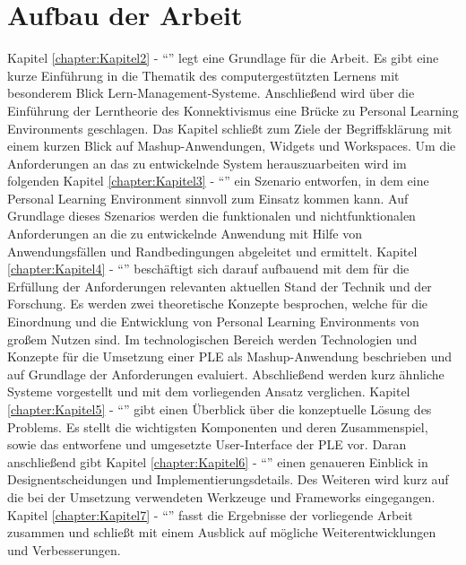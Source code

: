 \section{Aufbau der Arbeit}
Kapitel \ref{chapter:Kapitel2} - "`"' legt eine Grundlage für die Arbeit. Es gibt eine kurze Einführung in die Thematik des computergestützten Lernens mit besonderem Blick Lern-Management-Systeme. Anschließend wird über die Einführung der Lerntheorie des Konnektivismus eine Brücke zu Personal Learning Environments geschlagen. Das Kapitel schließt zum Ziele der Begriffsklärung mit einem kurzen Blick auf Mashup-Anwendungen, Widgets und Workspaces. Um die Anforderungen an das zu entwickelnde System herauszuarbeiten wird im folgenden Kapitel \ref{chapter:Kapitel3} - "`"' ein Szenario entworfen, in dem eine Personal Learning Environment sinnvoll zum Einsatz kommen kann. Auf Grundlage dieses Szenarios werden die funktionalen und nichtfunktionalen Anforderungen an die zu entwickelnde Anwendung mit Hilfe von Anwendungsfällen und Randbedingungen abgeleitet und ermittelt. Kapitel \ref{chapter:Kapitel4}  - "`"' beschäftigt sich darauf aufbauend mit dem für die Erfüllung der Anforderungen relevanten aktuellen Stand der Technik und der Forschung. Es werden zwei theoretische Konzepte besprochen, welche für die Einordnung und die Entwicklung von Personal Learning Environments von großem Nutzen sind. Im technologischen Bereich werden Technologien und Konzepte für die Umsetzung einer PLE als Mashup-Anwendung beschrieben und auf Grundlage der Anforderungen evaluiert. Abschließend werden kurz ähnliche Systeme vorgestellt und mit dem vorliegenden Ansatz verglichen. Kapitel \ref{chapter:Kapitel5} - "`"' gibt einen Überblick über die konzeptuelle Lösung des Problems. Es stellt die wichtigsten Komponenten und deren Zusammenspiel, sowie das entworfene und umgesetzte User-Interface der PLE vor. Daran anschließend gibt Kapitel \ref{chapter:Kapitel6}  - "`"' einen genaueren Einblick in Designentscheidungen und Implementierungsdetails. Des Weiteren wird kurz auf die bei der Umsetzung verwendeten Werkzeuge und Frameworks eingegangen. Kapitel \ref{chapter:Kapitel7}  - "`"' fasst die Ergebnisse der vorliegende Arbeit zusammen und schließt mit einem Ausblick auf mögliche Weiterentwicklungen und Verbesserungen.
